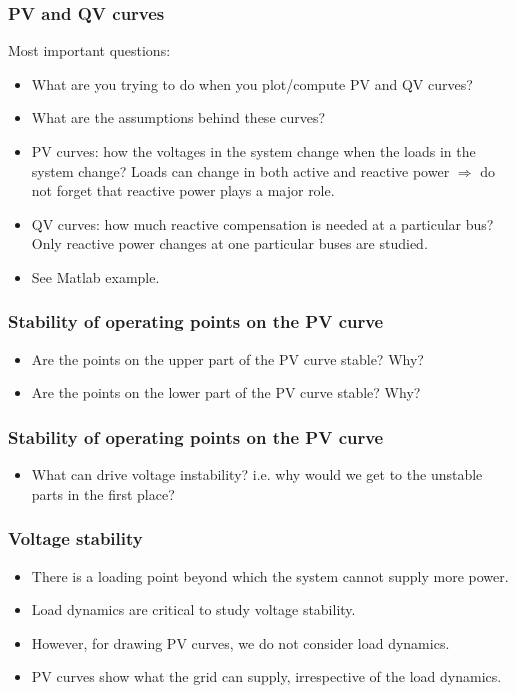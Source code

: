 \documentclass{beamer}
\newlength\fheight
\newlength\fwidth
\begin{document}
\begin{frame}
  \frametitle{PV and QV curves}
Most important questions: 
\begin{itemize}[<visible@+->]
\item What are you trying to do when you plot/compute PV and QV curves?  
\item What are the assumptions behind these curves?
\item PV curves: how the voltages in the system change when the loads in the system change? Loads can change in both active and reactive power $\Rightarrow$ do not forget that reactive power plays a major role.
\item QV curves: how much reactive compensation is needed at a particular bus? Only reactive power changes at one particular buses are studied.
\item See Matlab example.
\end{itemize}
\end{frame}

\begin{frame}
\frametitle{Stability of operating points on the PV curve}
  \setlength\fheight{0.3\textheight} 
\setlength{}

\begin{itemize}
\item Are the points on the upper part of the PV curve stable? Why?
\item Are the points on the lower part of the PV curve stable? Why?
\end{itemize}
\end{frame}

\begin{frame}
\frametitle{Stability of operating points on the PV curve}
  \setlength\fheight{0.3\textheight} 
\setlength{}

\begin{itemize}
\item What can drive voltage instability? i.e. why would we get to the unstable parts in the first place?
\end{itemize}
\end{frame}


\begin{frame}
  \frametitle{Voltage stability}
  \begin{itemize}
  \item There is a loading point beyond which the system cannot supply more power.
  \item Load dynamics are critical to study voltage stability.
  \item However, for drawing PV curves, we do not consider load dynamics.
  \item PV curves show what the grid can supply, irrespective of the load dynamics.
  \end{itemize}
\setlength\fheight{0.3\textheight} 
\setlength{}

\end{frame}
\end{document}
